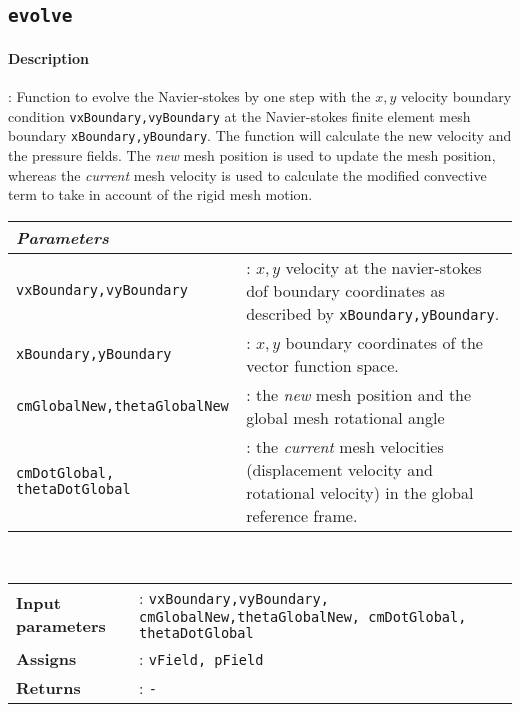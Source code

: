 \subsection{\texttt{evolve}}
	\paragraph{Description}: Function to evolve the Navier-stokes by one step with the $x,y$ velocity boundary condition \texttt{vxBoundary,vyBoundary} at the Navier-stokes finite element mesh boundary \texttt{xBoundary,yBoundary}. The function will calculate the new velocity and the pressure fields. The \textit{new} mesh position is used to update the mesh position, whereas the \textit{current} mesh velocity is used to calculate the modified convective term to take in account of the rigid mesh motion.\\
	
		\begin{tabular}{lp{10cm}}
			\textit{Parameters} & \\ \hline
			\texttt{vxBoundary,vyBoundary} &: $x,y$ velocity at the navier-stokes dof boundary coordinates as described by \texttt{xBoundary,yBoundary}.\\ 
			\texttt{xBoundary,yBoundary} &: $x,y$ boundary coordinates of the vector function space.\\ 
			\texttt{cmGlobalNew,thetaGlobalNew} &: the \textit{new} mesh position and the global mesh rotational angle\\
			\texttt{cmDotGlobal, thetaDotGlobal} &: the \textit{current} mesh velocities (displacement velocity and rotational velocity) in the global reference frame.\\
		\end{tabular} \vspace{5 mm}
	\\	
	\begin{tabular}{lp{10cm}}
		\textbf{Input parameters} &: \texttt{vxBoundary,vyBoundary, cmGlobalNew,thetaGlobalNew, cmDotGlobal, thetaDotGlobal}\\ 
		\textbf{Assigns} &: \texttt{vField, pField}\\ 			
		\textbf{Returns} &: \texttt{-}\\ 					
	\end{tabular}	


	

